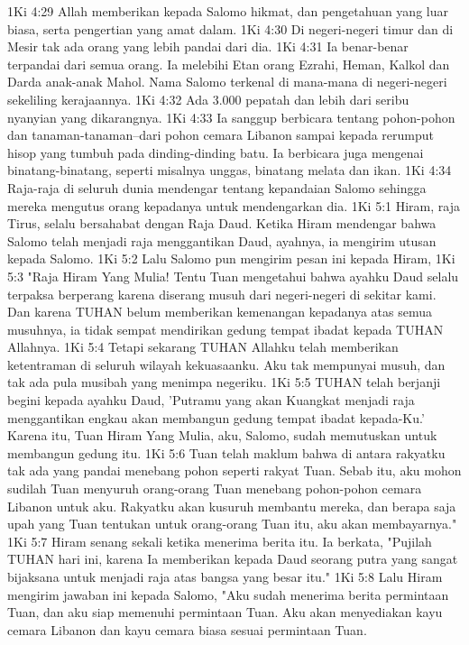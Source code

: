 1Ki 4:29  Allah memberikan kepada Salomo hikmat, dan pengetahuan yang luar biasa, serta pengertian yang amat dalam.
1Ki 4:30  Di negeri-negeri timur dan di Mesir tak ada orang yang lebih pandai dari dia.
1Ki 4:31  Ia benar-benar terpandai dari semua orang. Ia melebihi Etan orang Ezrahi, Heman, Kalkol dan Darda anak-anak Mahol. Nama Salomo terkenal di mana-mana di negeri-negeri sekeliling kerajaannya.
1Ki 4:32  Ada 3.000 pepatah dan lebih dari seribu nyanyian yang dikarangnya.
1Ki 4:33  Ia sanggup berbicara tentang pohon-pohon dan tanaman-tanaman--dari pohon cemara Libanon sampai kepada rerumput hisop yang tumbuh pada dinding-dinding batu. Ia berbicara juga mengenai binatang-binatang, seperti misalnya unggas, binatang melata dan ikan.
1Ki 4:34  Raja-raja di seluruh dunia mendengar tentang kepandaian Salomo sehingga mereka mengutus orang kepadanya untuk mendengarkan dia.
1Ki 5:1  Hiram, raja Tirus, selalu bersahabat dengan Raja Daud. Ketika Hiram mendengar bahwa Salomo telah menjadi raja menggantikan Daud, ayahnya, ia mengirim utusan kepada Salomo.
1Ki 5:2  Lalu Salomo pun mengirim pesan ini kepada Hiram,
1Ki 5:3  "Raja Hiram Yang Mulia! Tentu Tuan mengetahui bahwa ayahku Daud selalu terpaksa berperang karena diserang musuh dari negeri-negeri di sekitar kami. Dan karena TUHAN belum memberikan kemenangan kepadanya atas semua musuhnya, ia tidak sempat mendirikan gedung tempat ibadat kepada TUHAN Allahnya.
1Ki 5:4  Tetapi sekarang TUHAN Allahku telah memberikan ketentraman di seluruh wilayah kekuasaanku. Aku tak mempunyai musuh, dan tak ada pula musibah yang menimpa negeriku.
1Ki 5:5  TUHAN telah berjanji begini kepada ayahku Daud, 'Putramu yang akan Kuangkat menjadi raja menggantikan engkau akan membangun gedung tempat ibadat kepada-Ku.' Karena itu, Tuan Hiram Yang Mulia, aku, Salomo, sudah memutuskan untuk membangun gedung itu.
1Ki 5:6  Tuan telah maklum bahwa di antara rakyatku tak ada yang pandai menebang pohon seperti rakyat Tuan. Sebab itu, aku mohon sudilah Tuan menyuruh orang-orang Tuan menebang pohon-pohon cemara Libanon untuk aku. Rakyatku akan kusuruh membantu mereka, dan berapa saja upah yang Tuan tentukan untuk orang-orang Tuan itu, aku akan membayarnya."
1Ki 5:7  Hiram senang sekali ketika menerima berita itu. Ia berkata, "Pujilah TUHAN hari ini, karena Ia memberikan kepada Daud seorang putra yang sangat bijaksana untuk menjadi raja atas bangsa yang besar itu."
1Ki 5:8  Lalu Hiram mengirim jawaban ini kepada Salomo, "Aku sudah menerima berita permintaan Tuan, dan aku siap memenuhi permintaan Tuan. Aku akan menyediakan kayu cemara Libanon dan kayu cemara biasa sesuai permintaan Tuan.
